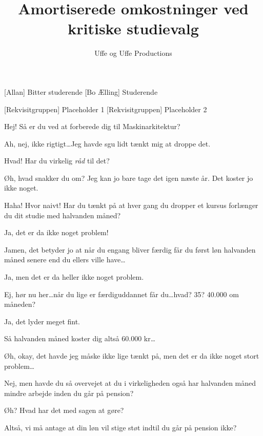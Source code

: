 \documentclass[a4paper,11pt]{article}
\title{Amortiserede omkostninger ved kritiske studievalg}
\author{Uffe og Uffe Productions\texttrademark}
\begin{document}
\maketitle

\begin{roles}
[Allan] Bitter studerende
[Bo Ælling] Studerende
\end{roles}


\begin{props}
[Rekvisitgruppen] Placeholder 1 
[Rekvisitgruppen] Placeholder 2
\end{props}

\begin{sketch}

 Hej! Så er du ved at forberede dig til Maskinarkitektur?

 Ah, nej, ikke rigtigt\dots Jeg havde sgu lidt tænkt mig at droppe det.

 Hvad! Har du virkelig \emph{råd} til det?

 Øh, hvad snakker du om? Jeg kan jo bare tage det igen næste år. Det
koster jo ikke noget.

 Haha! Hvor naivt! Har du tænkt på at hver gang du dropper et kursus
forlænger du dit studie med halvanden måned?

 Ja, det er da ikke noget problem!

 Jamen, det betyder jo at når du engang bliver færdig får du først
løn halvanden måned senere end du ellers ville have\dots

 Ja, men det er da heller ikke noget problem.

 Ej, hør nu her\dots når du lige er færdiguddannet får du\dots hvad? 35?
40.000 om måneden?

  Ja, det lyder meget fint.

 Så halvanden måned koster dig altså 60.000 kr\dots

 Øh, okay, det havde jeg måske ikke lige tænkt på, men det er da
ikke noget stort problem\dots

 Nej, men havde du så overvejet at du i virkeligheden også har
halvanden måned mindre arbejde inden du går på pension?

 Øh? Hvad har det med sagen at gøre?

 Altså, vi må antage at din løn vil stige støt indtil du går på pension ikke?


\end{sketch}
\end{document}

